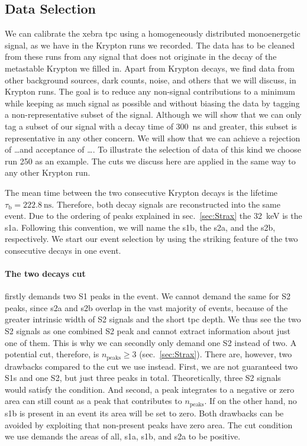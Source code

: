 
\FloatBarrier
\subsection{Data Selection}
\label{ssec:tagging}
\FloatBarrier



We can calibrate the \gls{xebra} \gls{tpc} using a homogeneously distributed monoenergetic signal, as we have in the Krypton runs we recorded.
The data has to be cleaned from these runs from any signal that does not originate in the decay of the metastable Krypton we filled in.
Apart from Krypton decays, we find data from other background sources, dark counts, noise, and others that we will discuss, in Krypton runs.
The goal is to reduce any non-signal contributions to a minimum while keeping as much signal as possible and without biasing the data by tagging a non-representative subset of the signal.
Although we will show that we can only tag a subset of our signal with a decay time of \SI{300}{\nano\s} and greater, this subset is representative in any other concern.
We will show that we can achieve a rejection of \dots and acceptance of \dots.  %
To illustrate the selection of data of this kind we choose run 250 as an example.
The cuts we discuss here are applied in the same way to any other Krypton run.


The mean time between the two consecutive Krypton decays is the lifetime $\tau_\mathrm{b} = \SI{222.8}{\nano\s}$.
Therefore, both decay signals are reconstructed into the same event.
Due to the ordering of peaks explained in sec.~\ref{sec:Strax} the \SI{32}{\kilo\eV} is the \gls{s1a}.
Following this convention, we will name the \gls{s1b}, the \gls{s2a}, and the \gls{s2b}, respectively.
We start our event selection by using the striking feature of the two consecutive decays in one event.


\paragraph{The two decays cut} firstly demands two S1 peaks in the event.
We cannot demand the same for S2 peaks, since \gls{s2a} and \gls{s2b} overlap in the vast majority of events, because of the greater intrinsic width of S2 signals and the short \gls{tpc} depth.
We thus see the two S2 signals as one combined S2 peak and cannot extract information about just one of them.
This is why we can secondly only demand one S2 instead of two.
A potential cut, therefore, is $n_\mathrm{peaks} \ge 3$ (sec.~\ref{sec:Strax}).
There are, however, two drawbacks compared to the cut we use instead.
First, we are not guaranteed two S1s and one S2, but just three peaks in total.
Theoretically, three S2 signals would satisfy the condition.
And second, a peak integrates to a negative or zero area can still count as a peak that contributes to $ n_\mathrm{peaks} $.
If on the other hand, no \gls{s1b} is present in an event its area will be set to zero.
Both drawbacks can be avoided by exploiting that non-present peaks have zero area.
The cut condition we use demands the areas of all, \gls{s1a}, \gls{s1b}, and \gls{s2a} to be positive.

